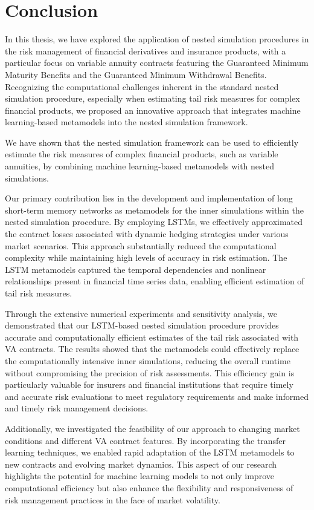 \chapter{Conclusion} \label{chap:conclusion}

In this thesis, we have explored the application of nested simulation procedures in the risk management of financial derivatives and insurance products, with a particular focus on variable annuity contracts featuring the Guaranteed Minimum Maturity Benefits and the Guaranteed Minimum Withdrawal Benefits. 
Recognizing the computational challenges inherent in the standard nested simulation procedure, especially when estimating tail risk measures for complex financial products, we proposed an innovative approach that integrates machine learning-based metamodels into the nested simulation framework.

We have shown that the nested simulation framework can be used to efficiently estimate the risk measures of complex financial products, such as variable annuities, by combining machine learning-based metamodels with nested simulations.

Our primary contribution lies in the development and implementation of long short-term memory networks as metamodels for the inner simulations within the nested simulation procedure. 
By employing LSTMs, we effectively approximated the contract losses associated with dynamic hedging strategies under various market scenarios. 
This approach substantially reduced the computational complexity while maintaining high levels of accuracy in risk estimation. 
The LSTM metamodels captured the temporal dependencies and nonlinear relationships present in financial time series data, enabling efficient estimation of tail risk measures.

Through the extensive numerical experiments and sensitivity analysis, we demonstrated that our LSTM-based nested simulation procedure provides accurate and computationally efficient estimates of the tail risk associated with VA contracts. 
The results showed that the metamodels could effectively replace the computationally intensive inner simulations, reducing the overall runtime without compromising the precision of risk assessments.
This efficiency gain is particularly valuable for insurers and financial institutions that require timely and accurate risk evaluations to meet regulatory requirements and make informed and timely risk management decisions.

Additionally, we investigated the feasibility of our approach to changing market conditions and different VA contract features. 
By incorporating the transfer learning techniques, we enabled rapid adaptation of the LSTM metamodels to new contracts and evolving market dynamics. 
This aspect of our research highlights the potential for machine learning models to not only improve computational efficiency but also enhance the flexibility and responsiveness of risk management practices in the face of market volatility.

